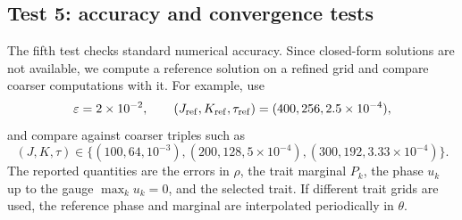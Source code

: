\documentclass[11pt]{article}
\begin{document}

\newpage

\subsection{Test 5: accuracy and convergence tests}\label{subsec:test_accuracy_new}

The fifth test checks standard numerical accuracy.  Since closed-form solutions are not available, we compute a reference solution on a refined grid and compare coarser computations with it.  For example, use
\[
    \varepsilon=2\times10^{-2},
    \qquad
    (J_{\rm ref},K_{\rm ref},\tau_{\rm ref})=(400,256,2.5\times10^{-4}),
\]
and compare against coarser triples such as
\[
    (J,K,\tau)\in
    \{(100,64,10^{-3}), (200,128,5\times10^{-4}), (300,192,3.33\times10^{-4})\}.
\]
The reported quantities are the errors in \(\rho\), the trait marginal \(P_k\), the phase \(u_k\) up to the gauge \(\max_k u_k=0\), and the selected trait.  If different trait grids are used, the reference phase and marginal are interpolated periodically in \(\theta\).
\end{document}

